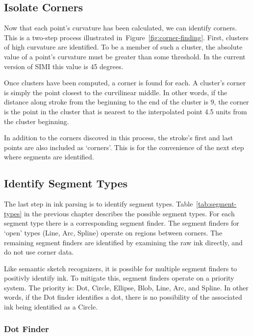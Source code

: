 \subsection{Isolate Corners}

Now that each point's curvature has been calculated, we can identify
corners. This is a two-step process illustrated
in~Figure~\ref{fig:corner-finding}. First, clusters of high curvature
are identified. To be a member of such a cluster, the absolute value
of a point's curvature must be greater than some threshold. In the
current version of SIMI this value is 45 degrees.



Once clusters have been computed, a corner is found for each. A
cluster's corner is simply the point closest to the curvilinear
middle. In other words, if the distance along stroke from the
beginning to the end of the cluster is 9, the corner is the point in
the cluster that is nearest to the interpolated point 4.5 units from
the cluster beginning. 

In addition to the corners discoved in this process, the stroke's
first and last points are also included as `corners'. This is for the
convenience of the next step where segments are identified.

\subsection{Identify Segment Types}

The last step in ink parsing is to identify segment
types. Table~\ref{tab:segment-types} in the previous chapter describes
the possible segment types. For each segment type there is a
corresponding segment finder. The segment finders for `open' types
(Line, Arc, Spline) operate on regions between corners. The remaining
segment finders are identified by examining the raw ink directly, and
do not use corner data.

Like semantic sketch recognizers, it is possible for multiple segment
finders to positivly identify ink. To mitigate this, segment finders
operate on a priority system. The priority is: Dot, Circle, Ellipse,
Blob, Line, Arc, and Spline. In other words, if the Dot finder
identifies a dot, there is no possibility of the associated ink being
identified as a Circle.

\subsubsection{Dot Finder}

